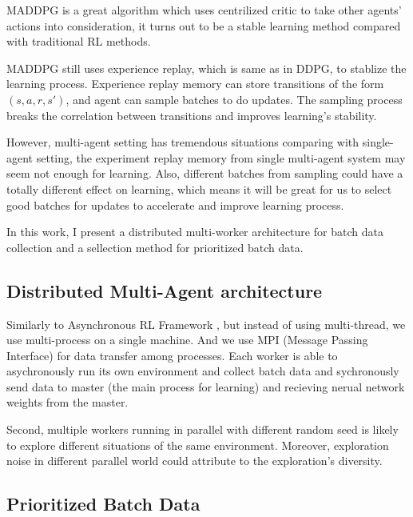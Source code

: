 \documentclass[11pt,twocolumn]{jarticle} %
\begin{document}
MADDPG is a great algorithm which uses centrilized critic to take other agents' actions into consideration, it turns out to be a stable learning method compared with traditional RL methods. \par

MADDPG still uses experience replay, which is same as in DDPG, to stablize the learning process. Experience replay \cite{replay} memory can store transitions of the form $(s,a,r,s')$, and agent can sample batches to do updates. The sampling process breaks the correlation between transitions and improves learning's stability. \par

However, multi-agent setting has tremendous situations comparing with single-agent setting, the experiment replay memory from single multi-agent system may seem not enough for learning. Also, different batches from sampling could have a totally different effect on learning, which means it will be great for us to select good batches for updates to accelerate and improve learning process. \par

In this work, I present a distributed multi-worker architecture for batch data collection and a sellection method for prioritized batch data.

\subsection{Distributed Multi-Agent architecture}

Similarly to Asynchronous RL Framework \cite{a3c}, but instead of using multi-thread, we use multi-process on a single machine. And we use MPI (Message Passing Interface) for data transfer among processes. Each worker is able to asychronously run its own environment and collect batch data and sychronously send data to master (the main process for learning) and recieving nerual network weights from the master. \par

Second, multiple workers running in parallel with different random seed is likely to explore different situations of the same environment. Moreover, exploration noise in different parallel world could attribute to the exploration's diversity. \par

\subsection{Prioritized Batch Data}
\end{document}
